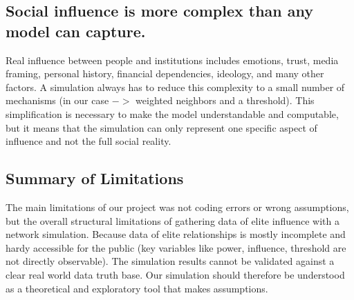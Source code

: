 \documentclass[12pt,a4paper,twocolumn]{article}
\begin{document}
\subsection{Social influence is more complex than any model can capture.}
Real influence between people and institutions includes emotions, trust, media framing, personal history, financial dependencies, ideology, and many other factors. A simulation always has to reduce this complexity to a small number of mechanisms (in our case $->$ weighted neighbors and a threshold). This simplification is necessary to make the model understandable and computable, but it means that the simulation can only represent one specific aspect of influence and not the full social reality.

\subsection{Summary of Limitations}
The main limitations of our project was not coding errors or wrong assumptions, but the overall structural limitations of gathering data of elite influence with a network simulation. Because data of elite relationships is mostly incomplete and hardy accessible for the public (key variables like power, influence, threshold are not directly observable). 
The simulation results cannot be validated against a clear real world data truth base. Our simulation should therefore be understood as a theoretical and exploratory tool that makes assumptions.


\newpage
\end{document}
